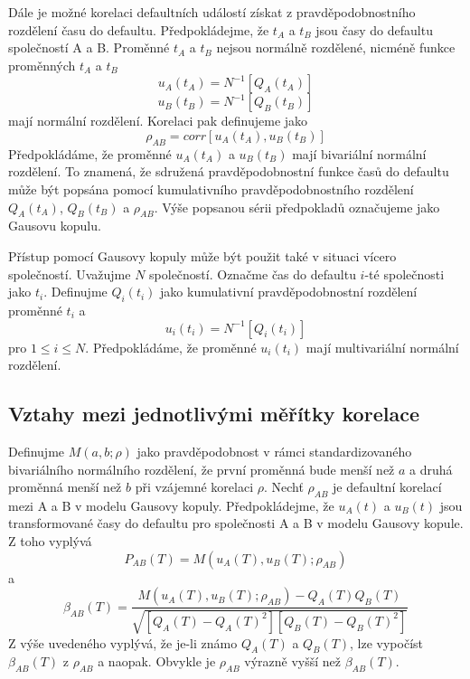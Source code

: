 \documentclass[a4paper]{book}
\begin{document}
Dále je možné korelaci defaultních událostí získat z pravděpodobnostního rozdělení času do defaultu. Předpokládejme, že $t_A$ a $t_B$ jsou časy do defaultu společností A a B. Proměnné $t_A$ a $t_B$ nejsou normálně rozdělené, nicméně funkce proměnných $t_A$ a $t_B$
\begin{equation*}
u_A(t_A) = N^{-1}[Q_A(t_A)]
\end{equation*} 
\begin{equation*}
u_B(t_B) = N^{-1}[Q_B(t_B)]
\end{equation*} 
mají normální rozdělení. Korelaci pak definujeme jako
\begin{equation*}
\rho_{AB} = corr[u_A(t_A), u_B(t_B)]
\end{equation*}
Předpokládáme, že proměnné $u_A(t_A)$ a $u_B(t_B)$ mají bivariální normální rozdělení. To znamená, že sdružená pravděpodobnostní funkce časů do defaultu může být popsána pomocí kumulativního pravděpodobnostního rozdělení $Q_A(t_A)$, $Q_B(t_B)$ a $\rho_{AB}$. Výše popsanou sérii předpokladů označujeme jako Gausovu kopulu.

Přístup pomocí Gausovy kopuly může být použit také v situaci vícero společností. Uvažujme $N$ společností. Označme čas do defaultu $i$-té společnosti jako $t_i$. Definujme $Q_i(t_i)$ jako kumulativní pravděpodobnostní rozdělení proměnné $t_i$ a
\begin{equation*}
u_i(t_i) = N^{-1}[Q_i(t_i)]
\end{equation*}
pro $1 \le i \le N$. Předpokládáme, že proměnné $u_i(t_i)$ mají multivariální normální rozdělení.

\subsection{Vztahy mezi jednotlivými měřítky korelace}

Definujme $M(a,b;\rho)$ jako pravděpodobnost v rámci standardizovaného bivariálního normálního rozdělení, že první proměnná bude menší než $a$ a druhá proměnná menší než $b$ při vzájemné korelaci $\rho$. Nechť $\rho_{AB}$ je defaultní korelací mezi A a B v modelu Gausovy kopuly. Předpokládejme, že $u_A(t)$ a $u_B(t)$ jsou transformované časy do defaultu pro společnosti A a B v modelu Gausovy kopule. Z toho vyplývá
\begin{equation*}
P_{AB}(T) = M(u_A(T), u_B(T); \rho_{AB})
\end{equation*}
a
\begin{equation*}
\beta_{AB}(T) = \frac{M(u_A(T),u_B(T); \rho_{AB})-Q_A(T)Q_B(T)}{\sqrt{[Q_A(T)-Q_A(T)^2][Q_B(T)-Q_B(T)^2]}}
\end{equation*}
Z výše uvedeného vyplývá, že je-li známo $Q_A(T)$ a $Q_B(T)$, lze vypočíst $\beta_{AB}(T)$ z $\rho_{AB}$ a naopak. Obvykle je $\rho_{AB}$ výrazně vyšší než $\beta_{AB}(T)$.
\end{document}
